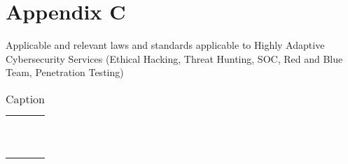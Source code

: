 \documentclass{article}
\begin{document}
\section{Appendix C}




Applicable and relevant laws and standards applicable to Highly Adaptive Cybersecurity Services (Ethical Hacking, Threat Hunting, SOC, Red and Blue Team, Penetration Testing)


\begin{table}
    \centering
    \begin{tabular}{cc}
         & \\
         & \\
         & \\
         & \\
         & \\
         & \\
         & \\
         & \\
         & \\
         & \\
    \end{tabular}
    \caption{Caption}
    \label{tab:placeholder}
\end{table}
\end{document}
